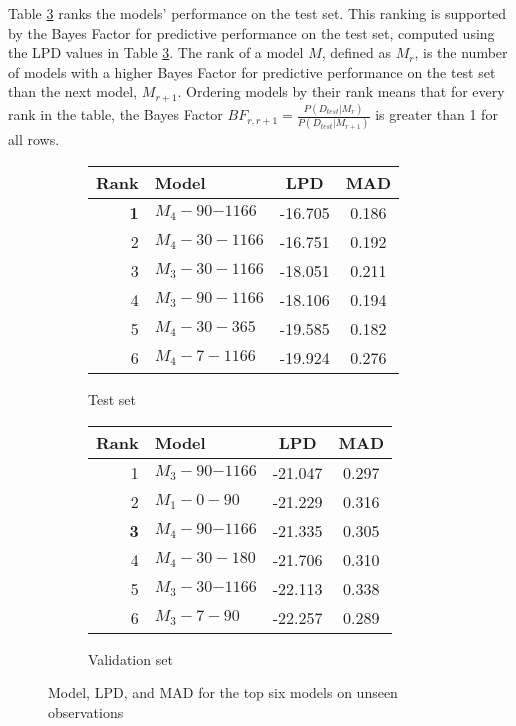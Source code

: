 Table \ref{tab:LPD_test} ranks the models' performance on the test set.
This ranking is supported by the Bayes Factor for predictive performance on the
test set, computed using the LPD values in Table \ref{tab:LPD_test}. The rank
of a model $M$, defined as $M_r$, is the number of models with a higher
Bayes Factor for predictive performance on the test set than the next model,
$M_{r+1}$. Ordering models by their rank means that for every rank in the
table, the Bayes Factor $BF_{r,r+1} =
\frac{P(D_{test}|M_r)}{P(D_{test}|M_{r+1})}$ is greater than 1 for all rows.
\begin{figure}[h]
  \centering
  \begin{subfigure}[b]{0.45\textwidth}
    \label{fig:LPD_test}
    \caption{Test set}
    \begin{tabular}{r l c c}
    \toprule
    \textbf{Rank} & \textbf{Model} & \textbf{LPD} & \textbf{MAD} \\ 
    \midrule
    \large{\textbf{1}} & $M_4{-}90{-1166}$ & -16.705& 0.186 \\
    2 & $M_4{-}30{-}1166$ & -16.751& 0.192 \\
    3 & $M_3{-}30{-}1166$ & -18.051& 0.211 \\
    4 & $M_3{-}90{-}1166$ & -18.106& 0.194 \\
    5 & $M_4{-}30{-}365$  & -19.585& 0.182 \\
    6 & $M_4{-}7{-}1166$  & -19.924& 0.276 \\
    \bottomrule
    \end{tabular}
  \end{subfigure}
  \begin{subfigure}[b]{0.45\textwidth}
    \label{fig:LPD_valid}
    \caption{Validation set}
    \begin{tabular}{r l c c}
    \toprule
    \textbf{Rank} & \textbf{Model} & \textbf{LPD} & \textbf{MAD} \\ 
    \midrule
    1 & $M_3{-}90{-1166}$ & -21.047& 0.297 \\
    2 & $M_1{-}0{-}90$ & -21.229& 0.316 \\
    \large{\textbf{3}} & $M_4{-}90{-1166}$ & -21.335& 0.305 \\
    4 & $M_4{-}30{-}180$ & -21.706& 0.310 \\
    5 & $M_3{-}30{-1166}$ & -22.113& 0.338 \\
    6 & $M_3{-}7{-}90$ & -22.257& 0.289 \\
    \bottomrule
    \end{tabular}
\end{subfigure}
\caption{Model, LPD, and MAD for the top six models on unseen observations}
\label{tab:LPD_test}
\end{figure}

